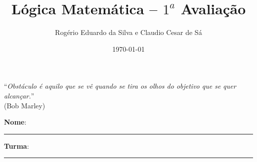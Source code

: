 \documentclass[12pt]{article}
\title{Lógica Matemática -- $1^a$ Avaliação}
\author{Rogério Eduardo da Silva e Claudio Cesar de Sá}
\date{\today}
\begin{document}
\pagestyle{empty}
\maketitle


%


\begin{flushright}
``\textit{Obstáculo é aquilo que se vê quando se tira os olhos do objetivo que se quer alcançar.}''\\ (Bob Marley)
\end{flushright}

\begin{flushleft}
\textbf{Nome}: \rule{10cm}{0.2mm} \textbf{Turma}: \rule{1cm}{0.2mm}
\end{flushleft}
\end{document}
